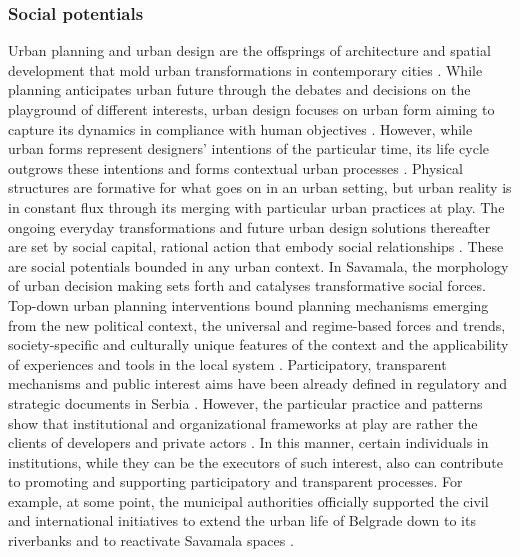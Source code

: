 \documentclass[11pt]{report}
\begin{document}
\subsubsection{Social potentials}

Urban planning and urban design are the offsprings of architecture and spatial development that mold urban transformations in contemporary cities \cite{Rode 2006}. While planning anticipates urban future through the debates and decisions on the playground of different interests, urban design focuses on urban form aiming to capture its dynamics in compliance with human objectives \cite{(Lynch and Rodwin 1958: 201)}.
However, while urban forms represent designers' intentions of the particular time, its life cycle outgrows these intentions and forms contextual urban processes \cite{Tonkiss 2014}.
Physical structures are formative for what goes on in an urban setting, but urban reality is in constant flux through its merging with particular urban practices at play.
The ongoing everyday transformations and future urban design solutions thereafter are set by social capital, rational action that embody social relationships \cite{Coleman 1988}.
These are social potentials bounded in any urban context.
In Savamala, the morphology of urban decision making sets forth and catalyses transformative social forces.
\\
Top-down urban planning interventions bound planning mechanisms emerging from the new political context, the universal and regime-based forces and trends, society-specific and culturally unique features of the context and the applicability of experiences and tools in the local system \cite{Adjustments of Planning practice Nedovic budic 2001}.
Participatory, transparent mechanisms and public interest aims have been already defined in regulatory and strategic documents in Serbia \cite{Vujosevic and Maricic 2012}. However, the particular practice and patterns show that institutional and organizational frameworks at play are rather the clients of developers and private actors \cite{Mrdjenovic et al 2015}.
In this manner, certain individuals in institutions, while they can be the executors of such interest, also can contribute to promoting and supporting participatory and transparent processes.
For example, at some point, the municipal authorities officially supported the civil and international initiatives to extend the urban life of Belgrade down to its riverbanks and to reactivate Savamala spaces \cite{Vanista Lazarevic in Doytchinov 2015}.\footnotemark
{} 
\end{document}
